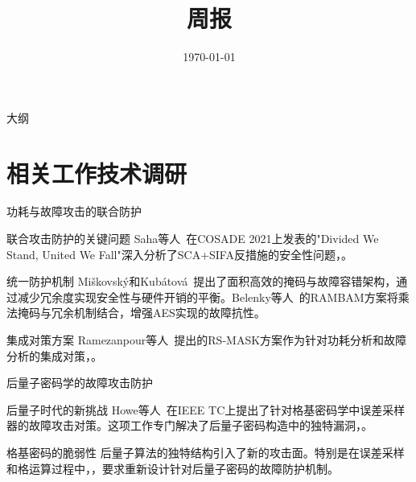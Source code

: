 \documentclass{beamer}
\title{\LARGE{周报}}
\subtitle{}
\author{}
\date{\today}
\begin{document}
\begin{frame}
  \titlepage
\end{frame}

\begin{frame}{大纲}
  \tableofcontents
\end{frame}

\section{相关工作技术调研}
\begin{frame}{功耗与故障攻击的联合防护}
  \begin{block}{联合攻击防护的关键问题}
    Saha等人~\cite{COSADE:SahBagJapMuk21}在COSADE 2021上发表的"Divided We Stand, United We Fall"深入分析了SCA+SIFA反措施的安全性问题，。
  \end{block}
  
  \begin{block}{统一防护机制}
    Miškovský和Kubátová~\cite{IEEE-TVLSI:MisKub21}提出了面积高效的掩码与故障容错架构，通过减少冗余度实现安全性与硬件开销的平衡。Belenky等人~\cite{TCHES:BelBugAzr22}的RAMBAM方案将乘法掩码与冗余机制结合，增强AES实现的故障抗性。
  \end{block}

  \begin{block}{集成对策方案}
    Ramezanpour等人~\cite{IEEE-TCAD:RamAmp20}提出的RS-MASK方案作为针对功耗分析和故障分析的集成对策，。
  \end{block}
\end{frame}

\begin{frame}{后量子密码学的故障攻击防护}
  \begin{block}{后量子时代的新挑战}
    Howe等人~\cite{IEEE-HOST:HowKhaMarNor19}在IEEE TC上提出了针对格基密码学中误差采样器的故障攻击对策。这项工作专门解决了后量子密码构造中的独特漏洞，。
  \end{block}
  
  \begin{block}{格基密码的脆弱性}
    后量子算法的独特结构引入了新的攻击面。特别是在误差采样和格运算过程中，，要求重新设计针对后量子密码的故障防护机制。
  \end{block}
\end{frame}
\end{document}
